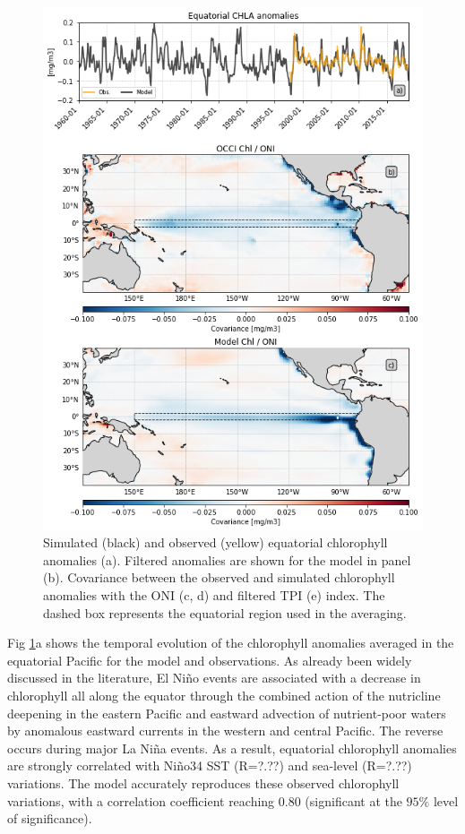\begin{figure}[h!tp]
	\centering
	\includegraphics[scale=0.4]{figs/fig2.png}
	\caption{Simulated (black) and observed (yellow) equatorial chlorophyll anomalies (a). Filtered anomalies are shown for the model in panel (b). Covariance between the observed and simulated chlorophyll anomalies with the ONI (c, d) and filtered TPI (e) index. The dashed box represents the equatorial region used in the averaging.}
	\label{fig:nemo-sat-chl}
\end{figure}

Fig \ref{fig:nemo-sat-chl}a shows the temporal evolution of the chlorophyll anomalies averaged in the equatorial Pacific for the model and observations. As already been widely discussed in the literature, El Niño events are associated with a decrease in chlorophyll all along the equator through the combined action of the nutricline deepening in the eastern Pacific and eastward advection of nutrient‐poor waters by anomalous eastward currents in the western and central Pacific. The reverse occurs during major La Niña events. As a result, equatorial chlorophyll anomalies are strongly correlated with Niño34 SST (R=?.??) and sea-level (R=?.??) variations. The model accurately reproduces these observed chlorophyll variations, with a correlation coefficient reaching $0.80$ (significant at the $95\%$ level of significance).

